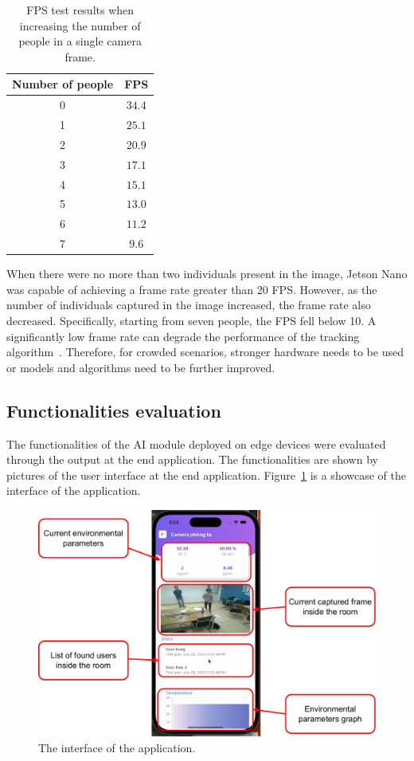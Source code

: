 \documentclass[../main.tex]{subfiles}
\begin{document}
\begin{table}[h!]
\centering
\begin{tabular}{||c | c ||} 
\hline 
Number of people & FPS \\
\hline
0 & $34.4$ \\
1 & $25.1$ \\
2 & $20.9$ \\
3 & $17.1$ \\
4 & $15.1$ \\
5 & $13.0$ \\
6 & $11.2$ \\
7 & $9.6$ \\
\hline
\end{tabular}
\caption{FPS test results when increasing the number of people in a single camera frame.}
\label{table:fps_test}
\end{table}

When there were no more than two individuals present in the image, Jetson Nano was capable of achieving a frame rate greater than 20 FPS. However, as the number of individuals captured in the image increased, the frame rate also decreased. Specifically, starting from seven people, the FPS fell below 10. A significantly low frame rate can degrade the performance of the tracking algorithm~\cite{mabrouk2022assessment}. Therefore, for crowded scenarios, stronger hardware needs to be used or models and algorithms need to be further improved.

\subsection{Functionalities evaluation}
The functionalities of the AI module deployed on edge devices were evaluated through the output at the end application. The functionalities are shown by pictures of the user interface at the end application. Figure~\ref{fig:interface_overview} is a showcase of the interface of the application.

\begin{figure}[h!]
\centering
\includegraphics[width=\linewidth]{Figure/overview_interface.pdf}
\caption{The interface of the application.}
\label{fig:interface_overview}
\end{figure}
\end{document}
